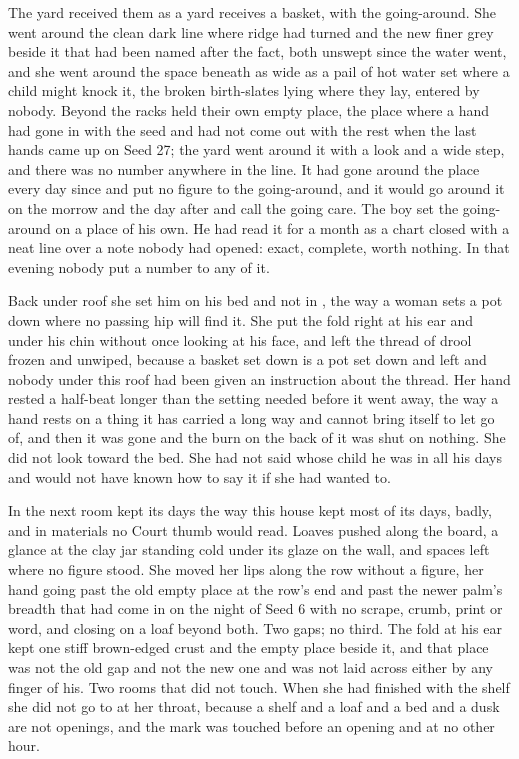 The yard received them as a yard receives a basket, with the going-around. She went around the clean dark line where  ridge had turned and the new finer grey beside it that had been named  after the fact, both unswept since the water went, and she went around the space beneath  as wide as a pail of hot water set where a child might knock it, the broken birth-slates lying where they lay, entered by nobody. Beyond the racks  held their own empty place, the place where a hand had gone in with the seed and had not come out with the rest when the last hands came up on Seed 27; the yard went around it with a look and a wide step, and there was no number anywhere in the line. It had gone around the place every day since and put no figure to the going-around, and it would go around it on the morrow and the day after and call the going care. The boy set the going-around on a place of his own. He had read it for a month as a chart closed with a neat line over a note nobody had opened: exact, complete, worth nothing. In  that evening nobody put a number to any of it.

\scenebreak

Back under  roof she set him on his bed and not in , the way a woman sets a pot down where no passing hip will find it. She put the fold right at his ear and under his chin without once looking at his face, and left the thread of drool frozen and unwiped, because a basket set down is a pot set down and left and nobody under this roof had been given an instruction about the thread. Her hand rested a half-beat longer than the setting needed before it went away, the way a hand rests on a thing it has carried a long way and cannot bring itself to let go of, and then it was gone and the burn on the back of it was shut on nothing. She did not look toward the bed. She had not said whose child he was in all his days and would not have known how to say it if she had wanted to.

In the next room  kept its days the way this house kept most of its days, badly, and in materials no Court thumb would read. Loaves pushed along the board, a glance at the clay jar standing cold under its glaze on the wall, and spaces left where no figure stood. She moved her lips along the row without a figure, her hand going past the old empty place at the row's end and past the newer palm's breadth that had come in on the night of Seed 6 with no scrape, crumb, print or word, and closing on a loaf beyond both. Two gaps; no third. The fold at his ear kept one stiff brown-edged crust and the empty place beside it, and that place was not the old gap and not the new one and was not laid across either by any finger of his. Two rooms that did not touch. When she had finished with the shelf she did not go to  at her throat, because a shelf and a loaf and a bed and a dusk are not openings, and the mark was touched before an opening and at no other hour.

